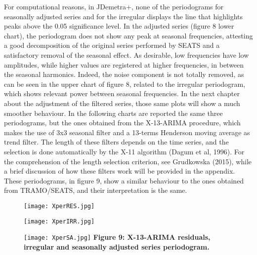 \documentclass{article}
\begin{document}
For computational reasons, in JDemetra+, none of the periodograms for seasonally adjusted series and for the irregular displays the line that highlights peaks above the 0.05 significance level. In the adjusted series (figure 8 lower chart), the periodogram does not show any peak at seasonal frequencies, attesting a good decomposition of the original series performed by SEATS and a satisfactory removal of the seasonal effect. As desirable, low frequencies have low amplitudes, while higher values are registered at higher frequencies, in between the seasonal harmonics. Indeed, the noise component is not totally removed, as can be seen in the upper chart of figure 8, related to the irregular periodogram, which shows relevant power between seasonal frequencies. In the next chapter about the adjustment of the filtered series, those same plots will show a much smoother behaviour. In the following charts are reported the same three periodograms, but the ones obtained from the X-13-ARIMA procedure, which makes the use of 3x3 seasonal filter and a 13-terms Henderson moving average as trend filter. The length of these filters depends on the time series, and the selection is done automatically by the X-11 algorithm (Dagum et al, 1996). For the comprehension of the length selection criterion, see Grudkowska (2015), while a brief discussion of how these filters work will be provided in the appendix. These periodograms, in figure 9, show a similar behaviour to the ones obtained from TRAMO/SEATS, and their interpretation is the same. 
\begin{figure}[H]
  \texttt{[image: XperRES.jpg]} 
  \label{fig:1}
\end{figure}
\begin{figure}[H]
  \texttt{[image: XperIRR.jpg]} 
  \label{fig:1}
\end{figure}
\begin{figure}[H]
  \texttt{[image: XperSA.jpg]} 
   {\textbf{\scriptsize Figure 9:  X-13-ARIMA residuals, irregular and seasonally adjusted series periodogram. }}
  \label{fig:1}
\end{figure}
\end{document}
